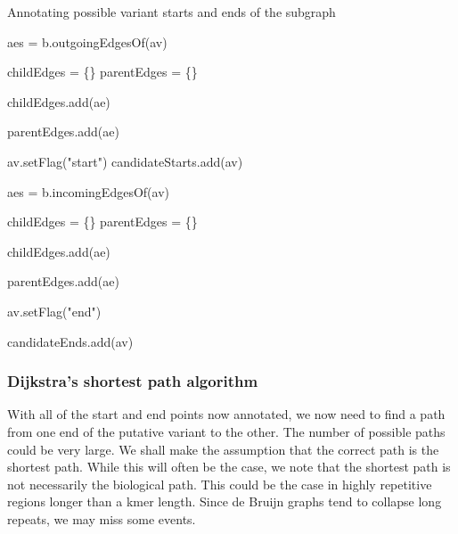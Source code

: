 \begin{algorithm}
\caption{Annotating possible variant starts and ends of the subgraph}
\label{alg:annotate_subgraph}
\begin{algorithmic}[1]
            \State aes = b.outgoingEdgesOf(av)

            \State childEdges = \{\}
            \State parentEdges = \{\}

                    \State childEdges.add(ae)
                \EndIf

                    \State parentEdges.add(ae)
                \EndIf
            \EndFor

                \State av.setFlag("start")
                \State candidateStarts.add(av)
            \EndIf
        \EndIf

            \State aes = b.incomingEdgesOf(av)

            \State childEdges = \{\}
            \State parentEdges = \{\}

                    \State childEdges.add(ae)
                \EndIf

                    \State parentEdges.add(ae)
                \EndIf
            \EndFor

                \State av.setFlag("end")

                \State candidateEnds.add(av)
            \EndIf
        \EndIf
    \EndFor
\EndFunction
\end{algorithmic}
\end{algorithm}

\subsubsection{Dijkstra's shortest path algorithm}

With all of the start and end points now annotated, we now need to find a path from one end of the putative variant to the other.  The number of possible paths could be very large.  We shall make the assumption that the correct path is the shortest path.  While this will often be the case, we note that the shortest path is not necessarily the biological path.  This could be the case in highly repetitive regions longer than a kmer length.  Since de Bruijn graphs tend to collapse long repeats, we may miss some events.


